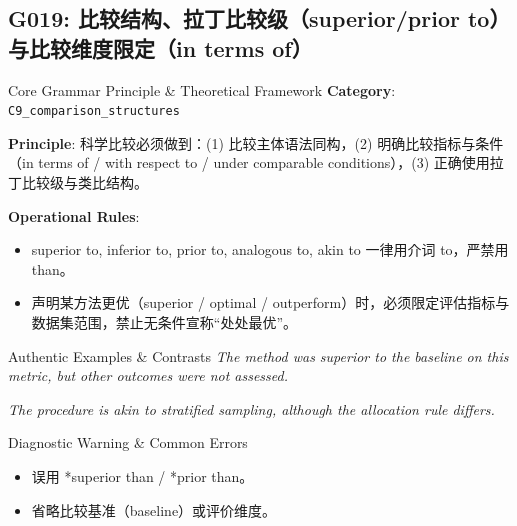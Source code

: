 \subsection{G019: 比较结构、拉丁比较级（superior/prior to）与比较维度限定（in terms of）}\label{sec:rule:G019}
\begin{ConceptBox}{Core Grammar Principle \& Theoretical Framework}
\textbf{Category}: \texttt{C9\_comparison\_structures}\par\vspace{3pt}
\textbf{Principle}: 科学比较必须做到：(1) 比较主体语法同构，(2) 明确比较指标与条件（in terms of / with respect to / under comparable conditions），(3) 正确使用拉丁比较级与类比结构。\par\vspace{4pt}
\textbf{Operational Rules}:
\begin{itemize}[leftmargin=1.5em, itemsep=1pt]
  \item superior to, inferior to, prior to, analogous to, akin to 一律用介词 to，严禁用 than。
  \item 声明某方法更优（superior / optimal / outperform）时，必须限定评估指标与数据集范围，禁止无条件宣称“处处最优”。
\end{itemize}
\end{ConceptBox}
\begin{ExampleBox}{Authentic Examples \& Contrasts}
\textit{The method was superior to the baseline on this metric, but other outcomes were not assessed.}\par\vspace{2pt}
\textit{The procedure is akin to stratified sampling, although the allocation rule differs.}\par\vspace{2pt}
\end{ExampleBox}
\begin{TipBox}{Diagnostic Warning \& Common Errors}
\begin{itemize}[leftmargin=1.5em, itemsep=1pt]
  \item 误用 *superior than / *prior than。
  \item 省略比较基准（baseline）或评价维度。
\end{itemize}
\end{TipBox}
\vspace{6pt}
